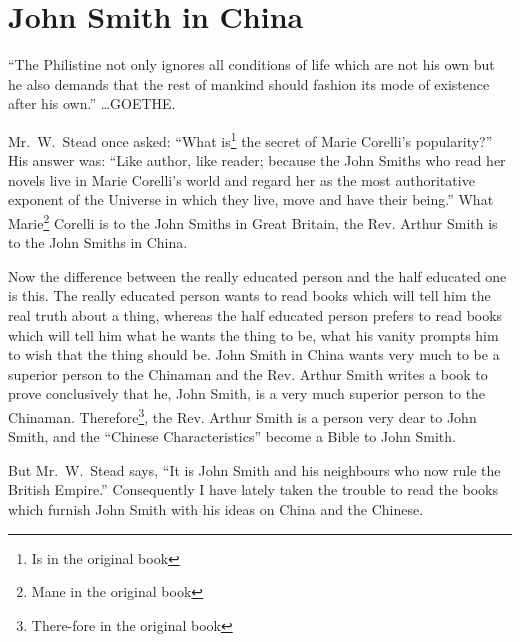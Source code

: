 \chapter{John Smith in China}
{ \scriptsize ``The Philistine not only ignores all conditions of life which are not his own but he also demands that the rest of mankind should fashion its mode of existence after his own.''\cite{num24} \dots GOETHE.}

Mr.~W.~Stead  once asked: ``What is\footnote{Is in the original book} the secret of Marie Corelli's  popularity?'' His answer was: ``Like author, like reader; because the John Smiths who read her novels live in Marie Corelli's world and regard her as the most authoritative exponent of the Universe in which they live, move and have their being.''
What Marie\footnote{Mane in the original book} Corelli is to the John Smiths in Great Britain, the Rev. Arthur Smith is to the John Smiths in China.

Now the difference between the really educated person and the half educated one is this.
The really educated person wants to read books which will tell him the real truth about a thing, whereas the half educated person prefers to read books which will tell him what he wants the thing to be, what his vanity prompts him to wish that the thing should be.
John Smith in China wants very much to be a superior person to the Chinaman and the Rev. Arthur Smith writes a book to prove conclusively that he, John Smith, is a very much superior person to the Chinaman.
Therefore\footnote{There-fore in the original book}, the Rev. Arthur Smith is a person very dear to John Smith, and the ``Chinese Characteristics'' become a Bible to John Smith.

But Mr.~W.~Stead says, ``It is John Smith and his neighbours who now rule the British Empire.''
Consequently I have lately taken the trouble to read the books which furnish John Smith with his ideas on China and the Chinese.


